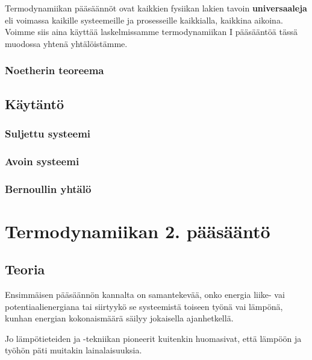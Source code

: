 \documentclass[12pt,a4paper,finnish]{book}
\begin{document}
Termodynamiikan pääsäännöt ovat kaikkien fysiikan lakien tavoin \textbf{universaaleja} 
eli voimassa kaikille systeemeille ja prosesseille kaikkialla, kaikkina aikoina. Voimme 
siis aina käyttää laskelmissamme termodynamiikan I pääsääntöä tässä muodossa yhtenä 
yhtälöistämme.

\subsection{Noetherin teoreema}

\section{Käytäntö} %

\subsection{Suljettu systeemi}

\subsection{Avoin systeemi}

\subsection{Bernoullin yhtälö}


\chapter{Termodynamiikan 2. pääsääntö} %

\section{Teoria} %

Ensimmäisen pääsäännön kannalta on samantekevää, onko energia liike- vai potentiaalienergiana tai 
siirtyykö se systeemistä toiseen työnä vai lämpönä, kunhan energian kokonaismäärä säilyy jokaisella 
ajanhetkellä.

Jo lämpötieteiden ja -tekniikan pioneerit kuitenkin huomasivat, että lämpöön ja työhön päti muitakin
lainalaisuuksia.
\end{document}
